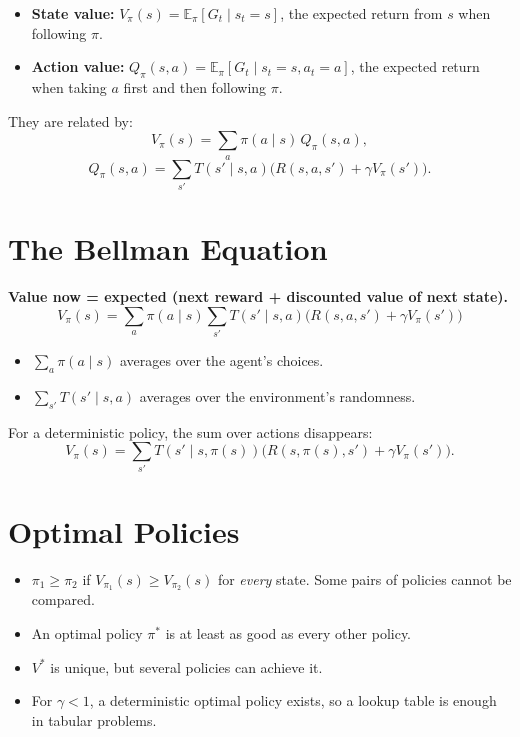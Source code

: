 \documentclass[11pt]{article}
\newcommand{\E}{\mathbb{E}}
\begin{document}
\begin{itemize}
  \item \textbf{State value:} $V_\pi(s) = \E_\pi[G_t \mid s_t = s]$, the expected return
        from $s$ when following $\pi$.
  \item \textbf{Action value:} $Q_\pi(s,a) = \E_\pi[G_t \mid s_t = s, a_t = a]$, the
        expected return when taking $a$ first and then following $\pi$.
\end{itemize}

They are related by:
\[
  V_\pi(s) = \sum_a \pi(a \mid s)\, Q_\pi(s,a),
\]
\[
  Q_\pi(s,a) = \sum_{s'} T(s' \mid s,a) \big( R(s,a,s') + \gamma V_\pi(s') \big).
\]

\section{The Bellman Equation}

\textbf{Value now = expected (next reward + discounted value of next state).}
\[
  V_\pi(s) = \sum_a \pi(a \mid s) \sum_{s'} T(s' \mid s,a)
             \big( R(s,a,s') + \gamma V_\pi(s') \big)
\]

\begin{itemize}
  \item $\sum_a \pi(a \mid s)$ averages over the agent's choices.
  \item $\sum_{s'} T(s' \mid s,a)$ averages over the environment's randomness.
\end{itemize}

For a deterministic policy, the sum over actions disappears:
\[
  V_\pi(s) = \sum_{s'} T(s' \mid s,\pi(s))
             \big( R(s,\pi(s),s') + \gamma V_\pi(s') \big).
\]

\section{Optimal Policies}

\begin{itemize}
  \item $\pi_1 \geq \pi_2$ if $V_{\pi_1}(s) \geq V_{\pi_2}(s)$ for \emph{every} state.
        Some pairs of policies cannot be compared.
  \item An optimal policy $\pi^*$ is at least as good as every other policy.
  \item $V^*$ is unique, but several policies can achieve it.
  \item For $\gamma < 1$, a deterministic optimal policy exists, so a lookup table is
        enough in tabular problems.
\end{itemize}
\end{document}

